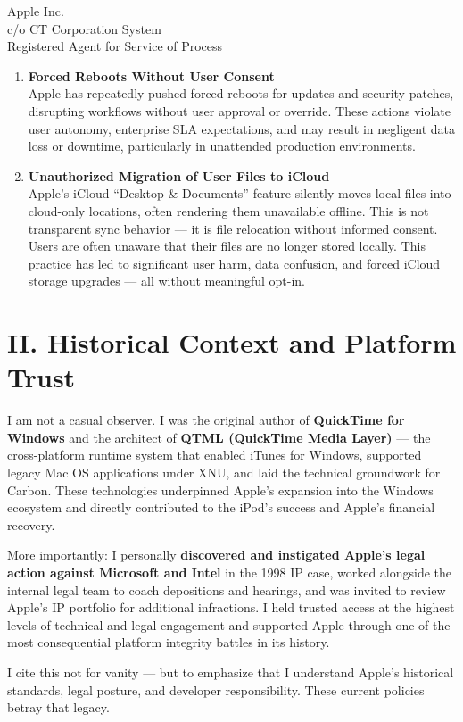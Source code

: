 \documentclass[11pt]{letter}
\begin{document}
\begin{letter}{Apple Inc.\\
    c/o CT Corporation System\\
    Registered Agent for Service of Process\\
    [Insert DE or CA Address Here]}
\begin{enumerate}
            \item \textbf{Forced Reboots Without User Consent} \\
            Apple has repeatedly pushed forced reboots for updates and security patches, disrupting workflows without user approval or override. These actions violate user autonomy, enterprise SLA expectations, and may result in negligent data loss or downtime, particularly in unattended production environments.

            \item \textbf{Unauthorized Migration of User Files to iCloud} \\
            Apple's iCloud ``Desktop \& Documents'' feature silently moves local files into cloud-only locations, often rendering them unavailable offline. This is not transparent sync behavior — it is file relocation without informed consent. Users are often unaware that their files are no longer stored locally. This practice has led to significant user harm, data confusion, and forced iCloud storage upgrades — all without meaningful opt-in.
        \end{enumerate}

        \section*{II. Historical Context and Platform Trust}

        I am not a casual observer. I was the original author of \textbf{QuickTime for Windows} and the architect of \textbf{QTML (QuickTime Media Layer)} — the cross-platform runtime system that enabled iTunes for Windows, supported legacy Mac OS applications under XNU, and laid the technical groundwork for Carbon. These technologies underpinned Apple's expansion into the Windows ecosystem and directly contributed to the iPod’s success and Apple’s financial recovery.

        More importantly: I personally \textbf{discovered and instigated Apple’s legal action against Microsoft and Intel} in the 1998 IP case, worked alongside the internal legal team to coach depositions and hearings, and was invited to review Apple’s IP portfolio for additional infractions. I held trusted access at the highest levels of technical and legal engagement and supported Apple through one of the most consequential platform integrity battles in its history.

        I cite this not for vanity — but to emphasize that I understand Apple’s historical standards, legal posture, and developer responsibility. These current policies betray that legacy.


\end{letter}
\end{document}

